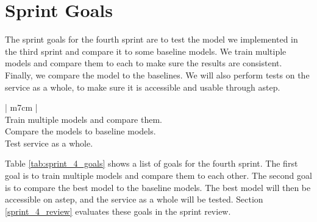 \section{Sprint Goals}
The sprint goals for the fourth sprint are to test the model we implemented in the third sprint and compare it to some baseline models. We train multiple models and compare them to each to make sure the results are consistent. Finally, we compare the model to the baselines. We will also perform tests on the service as a whole, to make sure it is accessible and usable through \gls{astep}. \newline

\bgroup
\def\arraystretch{1.8}
\begin{table}[htbp]
    \centering
    \begin{tabular}{| m{7cm} |}
        \hline
         \\
        \hline
        Train multiple models and compare them. \\
        \hline
        Compare the models to baseline models. \\
        \hline
        Test service as a whole. \\
        \hline
    \end{tabular}
    \caption{The fourth sprint goals.}
    \label{tab:sprint_4_goals}
\end{table}
\egroup

\noindent
Table \ref{tab:sprint_4_goals} shows a list of goals for the fourth sprint. The first goal is to train multiple models and compare them to each other. The second goal is to compare the best model to the baseline models. The best model will then be accessible on \gls{astep}, and the service as a whole will be tested. Section \ref{sprint_4_review} evaluates these goals in the sprint review.

